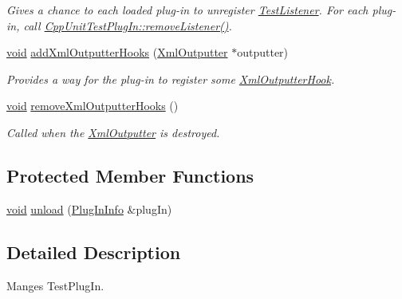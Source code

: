\begin{DoxyCompactItemize}
\begin{DoxyCompactList}\small\item\em Gives a chance to each loaded plug-\/in to unregister \hyperlink{class_test_listener}{Test\-Listener}. For each plug-\/in, call \hyperlink{struct_cpp_unit_test_plug_in_a8f36157014b515d38efbc8ab67923d85}{Cpp\-Unit\-Test\-Plug\-In\-::remove\-Listener()}. \end{DoxyCompactList}\item 
\hyperlink{wglew_8h_aeea6e3dfae3acf232096f57d2d57f084}{void} \hyperlink{class_plug_in_manager_a4a9c64e0ac3f762b100b993d7e33f889}{add\-Xml\-Outputter\-Hooks} (\hyperlink{class_xml_outputter}{Xml\-Outputter} $\ast$outputter)
\begin{DoxyCompactList}\small\item\em Provides a way for the plug-\/in to register some \hyperlink{class_xml_outputter_hook}{Xml\-Outputter\-Hook}. \end{DoxyCompactList}\item 
\hyperlink{wglew_8h_aeea6e3dfae3acf232096f57d2d57f084}{void} \hyperlink{class_plug_in_manager_a0fe59f82fd430ea57159a6ffad9a4035}{remove\-Xml\-Outputter\-Hooks} ()
\begin{DoxyCompactList}\small\item\em Called when the \hyperlink{class_xml_outputter}{Xml\-Outputter} is destroyed. \end{DoxyCompactList}\end{DoxyCompactItemize}
\subsection*{Protected Member Functions}
\begin{DoxyCompactItemize}
\item 
\hyperlink{wglew_8h_aeea6e3dfae3acf232096f57d2d57f084}{void} \hyperlink{class_plug_in_manager_afc1fa045afaac73cd44f69839056f1e1}{unload} (\hyperlink{struct_plug_in_manager_1_1_plug_in_info}{Plug\-In\-Info} \&plug\-In)
\end{DoxyCompactItemize}


\subsection{Detailed Description}
Manges Test\-Plug\-In. 


